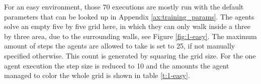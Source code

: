 For an easy environment, those 70 executions are mostly run with the default parameters that can be looked up in Appendix \ref{ax:training_params}. The agents solve an empty five by five grid here, in which they can only walk inside a three by three area, due to the surrounding walls, see Figure \ref{fig:1-easy}. The maximum amount of steps the agents are allowed to take is set to 25, if not manually specified otherwise. This count is generated by squaring the grid size. For the one agent execution the step size is reduced to 10 and the amounts the agent managed to color the whole grid is shown in table \ref{t:1-easy}.




